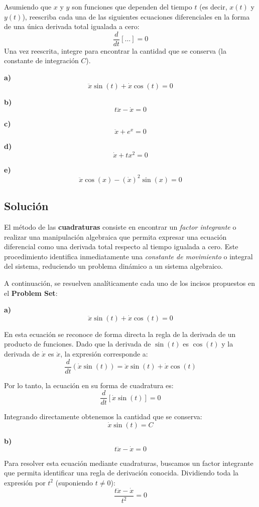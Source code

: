 \documentclass[12pt, letterpaper]{article}
\begin{document}
Asumiendo que $x$ y $y$ son funciones que dependen del tiempo $t$ (es decir, $x(t)$ y $y(t)$), reescriba cada una de las siguientes ecuaciones diferenciales en la forma de una única derivada total igualada a cero:
$$ \frac{d}{dt} [ \dots ] = 0 $$
Una vez reescrita, integre para encontrar la cantidad que se conserva (la constante de integración $C$).

\textbf{a)}
$$ \ddot{x} \sin(t) + \dot{x} \cos(t) = 0 $$

\textbf{b)}
$$ t\ddot{x} - \dot{x} = 0 $$

\textbf{c)}
$$ \ddot{x} + e^x = 0 $$

\textbf{d)}
$$ \dot{x} + tx^2 = 0 $$

\textbf{e)}
$$ \ddot{x} \cos(x) - (\dot{x})^2 \sin(x) = 0 $$


\subsection{Solución}

El método de las \textbf{cuadraturas} consiste en encontrar un \textit{factor integrante} o realizar una manipulación algebraica que permita expresar una ecuación diferencial como una derivada total respecto al tiempo igualada a cero. Este procedimiento identifica inmediatamente una \textit{constante de movimiento} o integral del sistema, reduciendo un problema dinámico a un sistema algebraico.

A continuación, se resuelven analíticamente cada uno de los incisos propuestos en el \textbf{Problem Set}:

\textbf{a)} 
$$ \ddot{x} \sin(t) + \dot{x} \cos(t) = 0 $$

En esta ecuación se reconoce de forma directa la regla de la derivada de un producto de funciones. Dado que la derivada de $ \sin(t) $ es $ \cos(t) $ y la derivada de $ \dot{x} $ es $ \ddot{x} $, la expresión corresponde a:
$$ \frac{d}{dt} (\dot{x} \sin(t)) = \ddot{x} \sin(t) + \dot{x} \cos(t) $$

Por lo tanto, la ecuación en su forma de cuadratura es:
$$ \frac{d}{dt} [\dot{x} \sin(t)] = 0 $$

Integrando directamente obtenemos la cantidad que se conserva:
$$ \dot{x} \sin(t) = C $$

\textbf{b)} 
$$ t\ddot{x} - \dot{x} = 0 $$

Para resolver esta ecuación mediante cuadraturas, buscamos un factor integrante que permita identificar una regla de derivación conocida. Dividiendo toda la expresión por $ t^2 $ (suponiendo $ t \neq 0 $):
$$ \frac{t\ddot{x} - \dot{x}}{t^2} = 0 $$
\end{document}
